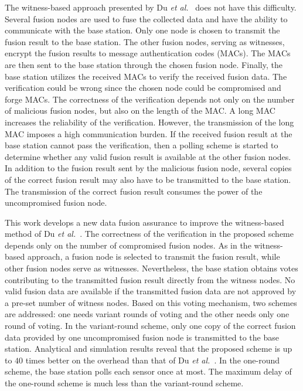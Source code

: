 \documentclass[12pt, onecolumn, draftcls]{IEEEtran}
\begin{document}
The witness-based approach presented by Du {\it et
al.}~\cite{du:assurance} does not have this difficulty. Several
fusion nodes are used to fuse the collected data and have the
ability to communicate with the base station. Only one node is
chosen to transmit the fusion result to the base station. The other
fusion nodes, serving as witnesses, encrypt the fusion results to
message authentication codes (MACs). The MACs are then sent to the
base station through the chosen fusion node. Finally, the base
station utilizes the received MACs to verify the received fusion
data. The verification could be wrong since the chosen node could be
compromised and forge MACs. The correctness of the verification
depends not only on the number of malicious fusion nodes, but also
on the length of the MAC. A long MAC increases the reliability of
the verification. However, the transmission of the long MAC imposes
a high communication burden. If the received fusion result at the
base station cannot pass the verification, then a polling scheme is
started to determine whether any valid fusion result is available at
the other fusion nodes. In addition to the fusion result sent by the
malicious fusion node, several copies of the correct fusion result
may also have to be transmitted to the base station. The
transmission of the correct fusion result consumes the power of the
uncompromised fusion node.

This work develops a new data fusion assurance to improve the
witness-based method of Du {\it et al.}~\cite{du:assurance}. The
correctness of the verification in the proposed scheme depends only
on the number of compromised fusion nodes. As in the witness-based
approach, a fusion node is selected to transmit the fusion result,
while other fusion nodes serve as witnesses. Nevertheless, the base
station obtains votes contributing to the transmitted fusion result
directly from the witness nodes. No valid fusion data are available
if the transmitted fusion data are not approved by a pre-set number
of witness nodes. Based on this voting mechanism, two schemes are
addressed: one needs variant rounds of voting and the other needs
only one round of voting. In the variant-round scheme, only one copy
of the correct fusion data provided by one uncompromised fusion node
is transmitted to the base station. Analytical and simulation
results reveal that the proposed scheme is up to $40$ times better
on the overhead than that of Du {\it et al.}~\cite{du:assurance}. In
the one-round scheme, the base station polls each sensor once at
most. The maximum delay of the one-round scheme is much less than
the variant-round scheme.
\end{document}
